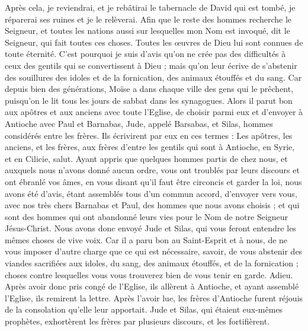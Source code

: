 \begin{multicols}{2}
Après cela, je reviendrai, et je rebâtirai le tabernacle de David qui est tombé, je réparerai ses ruines et je le relèverai.
Afin que le reste des hommes recherche le Seigneur, et toutes les nations aussi sur lesquelles mon Nom est invoqué, dit le Seigneur, qui fait toutes ces choses.
Toutes les œuvres de Dieu lui sont connues de toute éternité.
C'est pourquoi je suis d'avis qu’on ne crée pas des difficultés à ceux des gentils qui se convertissent à Dieu ;
mais qu’on leur écrive de s’abstenir des souillures des idoles et de la fornication, des animaux étouffés et du sang.
Car depuis bien des générations, Moïse a dans chaque ville des gens qui le prêchent, puisqu’on le lit tous les jours de sabbat dans les synagogues.
Alors il parut bon aux apôtres et aux anciens avec toute l'Eglise, de choisir parmi eux et d'envoyer à Antioche avec Paul et Barnabas, Jude, appelé Barsabas, et Silas, hommes considérés entre les frères.
Ils écrivirent par eux en ces termes : Les apôtres, les anciens, et les frères, aux frères d'entre les gentils qui sont à Antioche, en Syrie, et en Cilicie, salut.
Ayant appris que quelques hommes partis de chez nous, et auxquels nous n’avons donné aucun ordre, vous ont troublés par leurs discours et ont ébranlé vos âmes, en vous disant qu’il faut être circoncis et garder la loi,
nous avons été d'avis, étant assemblés tous d'un commun accord, d'envoyer vers vous, avec nos très chers Barnabas et Paul, des hommes que nous avons choisis ;
et qui sont des hommes qui ont abandonné leurs vies pour le Nom de notre Seigneur Jésus-Christ.
Nous avons donc envoyé Jude et Silas, qui vous feront entendre les mêmes choses de vive voix.
Car il a paru bon au Saint-Esprit et à nous, de ne vous imposer d’autre charge que ce qui est nécessaire,
savoir, de vous abstenir des viandes sacrifiées aux idoles, du sang, des animaux étouffés, et de la fornication ; choses contre lesquelles vous vous trouverez bien de vous tenir en garde. Adieu.
Après avoir donc pris congé de l’Eglise, ils allèrent à Antioche, et ayant assemblé l'Eglise, ils remirent la lettre.
Après l’avoir lue, les frères d’Antioche furent réjouis de la consolation qu’elle leur apportait.
Jude et Silas, qui étaient eux-mêmes prophètes, exhortèrent les frères par plusieurs discours, et les fortifièrent.

\end{multicols}

